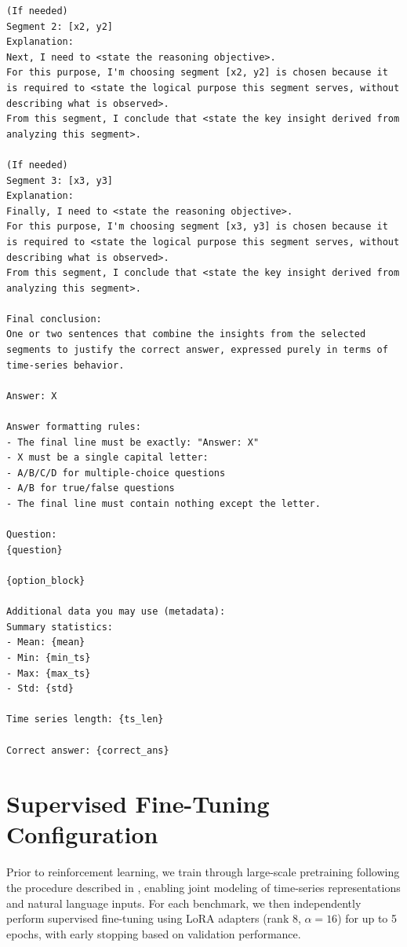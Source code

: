 \begin{center}
\begin{tcolorbox}[
        breakable,          
        colback=gray!5,    
        colframe=black, 
        arc=2mm,  
        boxrule=0.5pt,
        fontupper=\footnotesize
    ]
\begin{Verbatim}[breaklines=true, breakanywhere=true]
(If needed)
Segment 2: [x2, y2]
Explanation:
Next, I need to <state the reasoning objective>.
For this purpose, I'm choosing segment [x2, y2] is chosen because it is required to <state the logical purpose this segment serves, without describing what is observed>.
From this segment, I conclude that <state the key insight derived from analyzing this segment>.

(If needed)
Segment 3: [x3, y3]
Explanation:
Finally, I need to <state the reasoning objective>.
For this purpose, I'm choosing segment [x3, y3] is chosen because it is required to <state the logical purpose this segment serves, without describing what is observed>.
From this segment, I conclude that <state the key insight derived from analyzing this segment>.

Final conclusion:
One or two sentences that combine the insights from the selected segments to justify the correct answer, expressed purely in terms of time-series behavior.

Answer: X

Answer formatting rules:
- The final line must be exactly: "Answer: X"
- X must be a single capital letter:
- A/B/C/D for multiple-choice questions
- A/B for true/false questions
- The final line must contain nothing except the letter.

Question:
{question}

{option_block}

Additional data you may use (metadata):
Summary statistics:
- Mean: {mean}
- Min: {min_ts}
- Max: {max_ts}
- Std: {std}

Time series length: {ts_len}

Correct answer: {correct_ans}
\end{Verbatim}
\end{tcolorbox}
\end{center}

\section{Supervised Fine-Tuning Configuration}
\label{app:sft_trainig_details}
Prior to reinforcement learning, we train \algoname through large-scale pretraining following the procedure described in \cite{chatts}, enabling joint modeling of time-series representations and natural language inputs. 
For each benchmark, we then independently perform supervised fine-tuning using LoRA adapters (rank 8, $\alpha = 16$) for up to 5 epochs, with early stopping based on validation performance.

